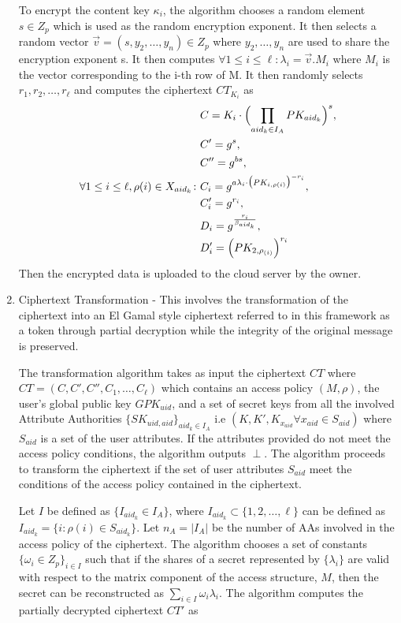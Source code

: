 \begin{enumerate}
	To encrypt the content key $\kappa_{i}$, the algorithm chooses a random element $ s \in Z_{p} $ which is used as the random encryption exponent. It then selects a random vector $ \vec{v} = (s, y_{2},\ldots,y_{n}) \in Z_{p} $ where $ y_{2},\ldots,y_{n} $ are used to share the encryption exponent s. It then computes $ \forall 1 \leq i \leq \ell: \lambda_{i} = \vec{v}.M_{i} $ where $ M_{i} $ is the vector corresponding to the i-th row of M. It then randomly selects $ r_{1},r_{2},\ldots,r_{\ell} $ and computes the ciphertext $CT_{K_{i}}$ as	
	\begin{align}
	\begin{split}
	&C = K_{i}\cdot\Bigl(\prod\limits_{aid_{k} \in I_{A}}PK_{aid_{k}}\Bigl)^{s}, \\ &C' = g^{s}, \\ &C'' = g^{bs},\\
	\forall 1 \leq i \leq \ell, \rho(i) \in X_{aid_{k}} \colon &C_{i} = g^{a\lambda_{i}\cdot\bigl(PK_{i,\rho(i)}\bigl)^{-r_{i}}},\\ &C'_{i} = g^{r_{i}}, \\ &D_{i} = g^{\frac{r_{i}}{\beta_{aid_k}}}, \\ &D'_{i} = \Bigl(PK_{2,\rho_{(i)}}\Bigl)^{r_{i}}
	\end{split}
	\end{align}
	Then the encrypted data is uploaded to the cloud server by the owner.
	
	\item Ciphertext Transformation - This involves the transformation of the ciphertext into an El Gamal style ciphertext referred to in this framework as a token through partial decryption while the integrity of the original message is preserved.
	
	The transformation algorithm takes as input the ciphertext $CT$ where $CT = (C, C', C'', C_1,\ldots,C_\ell)$ which contains an access policy $(M,\rho)$, the user's global public key $GPK_{uid}$, and a set of secret keys from all the involved Attribute Authorities $\{SK_{uid,aid}\}_{aid_k \in I_{A}}$ i.e $(K, K', K_{x_{aid}} \forall x_{aid} \in S_{aid})$ where $S_{aid}$ is a set of the user attributes. If the attributes provided do not meet the access policy conditions, the algorithm outputs $\perp$. The algorithm proceeds to transform the ciphertext if the set of user attributes $S_{aid}$ meet the conditions of the access policy contained in the ciphertext.
	
	Let $I$ be defined as $\{I_{aid_k} \in I_{A}\}$, where $I_{aid_k} \subset \{1,2,\ldots,\ell\}$ can be defined as $I_{aid_k} = \{i: \rho(i) \in S_{aid_k}\}$. Let $n_A = |I_A|$ be the number of AAs  involved in the access policy of the ciphertext. The algorithm chooses a set of constants $\{\omega_{i} \in Z_p\}_{i \in I}$ such that if the shares of a secret represented by $\{\lambda_{i}\}$ are valid with respect to the matrix component of the access structure, $M$, then the secret can be reconstructed as $\sum_{i \in I}\omega_{i}\lambda_{i}$. The algorithm computes the partially decrypted ciphertext $CT'$ as
	

\end{enumerate}
